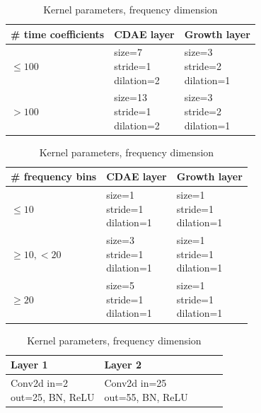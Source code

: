 \documentclass[report.tex]{subfiles}
\begin{document}
\begin{table}[ht]
	\centering
	\begin{tabular}{ |l|l|l| }
	 \hline
		\# time coefficients & CDAE layer & Growth layer \\
	 \hline
	 \hline
		$\le 100$ & \makecell[l]{size=7\\stride=1\\dilation=2} & \makecell[l]{size=3\\stride=2\\dilation=1} \\
	 \hline
		$> 100$ & \makecell[l]{size=13\\stride=1\\dilation=2} & \makecell[l]{size=3\\stride=2\\dilation=1} \\
	 \hline
\end{tabular}
	\caption{Kernel parameters, time dimension}
	\label{table:convtable1}
	\vspace{1em}
\begin{tabular}{ |l|l|l| }
	 \hline
		\# frequency bins & CDAE layer & Growth layer \\
	 \hline
	 \hline
		$\le 10$ & \makecell[l]{size=1\\stride=1\\dilation=1} & \makecell[l]{size=1\\stride=1\\dilation=1} \\
	 \hline
		$\ge 10, < 20$ & \makecell[l]{size=3\\stride=1\\dilation=1} & \makecell[l]{size=1\\stride=1\\dilation=1} \\
	 \hline
		$\ge 20$ & \makecell[l]{size=5\\stride=1\\dilation=1} & \makecell[l]{size=1\\stride=1\\dilation=1} \\
	 \hline
\end{tabular}
	\caption{Kernel parameters, frequency dimension}
	\label{table:convtable2}
	\vspace{1em}
\begin{tabular}{ |l|l|l|l|l| }
	 \hline
		Layer 1 & Layer 2 \\
	 \hline
	 \hline
		Conv2d \makecell[l]{in=2\\out=25}, BN, ReLU & Conv2d \makecell[l]{in=25\\out=55}, BN, ReLU \\

\end{tabular}
\end{table}
\end{document}
